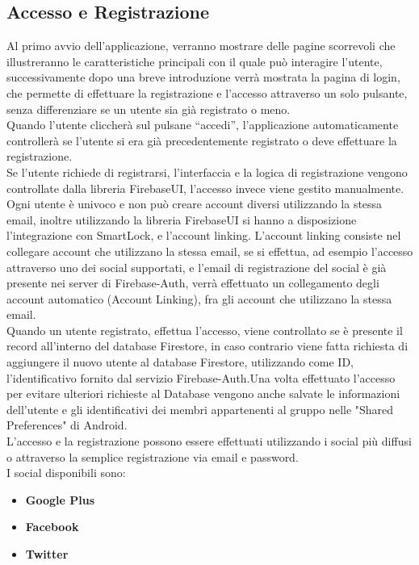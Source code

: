 \subsection{Accesso e Registrazione}
Al primo avvio dell'applicazione, verranno mostrare delle pagine scorrevoli che illustreranno le caratteristiche principali con il quale può interagire l'utente, successivamente dopo una breve introduzione verrà mostrata la pagina di login, che permette di effettuare la registrazione e l'accesso attraverso un solo pulsante, senza differenziare se un utente sia già registrato o meno.\\
Quando l'utente cliccherà sul pulsane ``accedi'', l'applicazione automaticamente controllerà se l'utente si era già precedentemente registrato o deve effettuare la registrazione.\\
Se l'utente richiede di registrarsi, l'interfaccia e la logica di registrazione vengono controllate dalla libreria FirebaseUI, l'accesso invece viene gestito manualmente.\\
Ogni utente è univoco e non può creare account diversi utilizzando la stessa email, inoltre utilizzando la libreria FirebaseUI si hanno a disposizione l'integrazione con SmartLock, e l'account linking.
L'account linking consiste nel collegare account che utilizzano la stessa email, se si effettua, ad esempio l'accesso attraverso uno dei social supportati, e l'email di registrazione del social è già presente nei server di Firebase-Auth, verrà effettuato un collegamento degli account automatico (Account Linking), fra gli account che utilizzano la stessa email.\\
Quando un utente registrato, effettua l'accesso, viene controllato se è presente il record all'interno del database Firestore, in caso contrario viene fatta richiesta di aggiungere il nuovo utente al database Firestore, utilizzando come ID, l'identificativo fornito dal servizio Firebase-Auth.Una volta effettuato l'accesso per evitare ulteriori richieste al Database vengono anche salvate le informazioni dell'utente e gli identificativi dei membri appartenenti al gruppo nelle "Shared Preferences" di Android.\\
L'accesso e la registrazione possono essere effettuati utilizzando i social più diffusi o attraverso la semplice registrazione via email e password.\\
I social disponibili sono:
\begin{itemize}
  \item \textbf{Google Plus}
  \item \textbf{Facebook}
  \item \textbf{Twitter}
\end{itemize}
